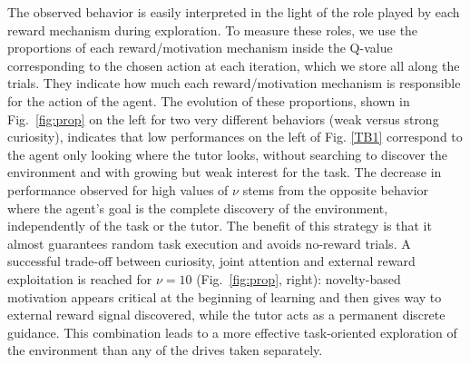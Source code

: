 \documentclass[letterpaper, 10 pt, conference]{ieeeconf}  %
\begin{document}
The observed behavior is easily interpreted in the light of the role played by each reward mechanism during exploration. To measure these roles, we use the proportions of each reward/motivation mechanism inside the Q-value corresponding to the chosen action at each iteration, which we store all along the trials. They indicate how much each reward/motivation mechanism is responsible for the action of the agent. The evolution of these proportions,  shown in Fig.~\ref{fig:prop} on the left for two very different behaviors (weak versus strong curiosity), indicates that low performances on the left of Fig. \ref{TB1} correspond to the agent only looking where the tutor looks, without searching to discover the environment and with growing but weak interest for the task. The decrease in performance observed for high values of $\nu$ stems from the opposite behavior where the agent's goal is the complete discovery of the environment, independently of the task or the tutor. The benefit of this strategy is that it almost guarantees random task execution and avoids no-reward trials. A successful trade-off between curiosity, joint attention and external reward exploitation is reached for $\nu=10$ (Fig.~\ref{fig:prop}, right): novelty-based motivation appears critical at the beginning of learning and then gives way to external reward signal discovered, while the tutor acts as a permanent discrete guidance. This combination leads to a more effective task-oriented exploration of the environment than any of the drives taken separately.
\end{document}
